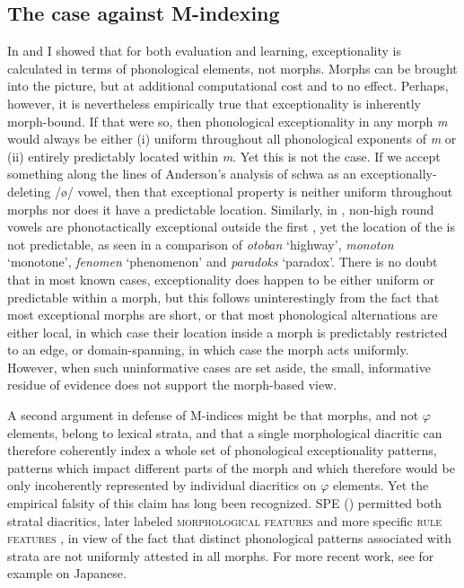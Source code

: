 \documentclass[output=paper,
modfonts
]{LSP/langsci}
\begin{document}
\subsection[The case against M{}-indexing]{The case against M-indexing}\label{sec:round:9.2}
\label{bkm:Ref336968525}
In  and  I showed that for both  evaluation and  learning, exceptionality is calculated in terms of phonological elements, not morphs. Morphs can be brought into the picture, but at additional computational cost and to no effect. Perhaps, however, it is nevertheless empirically true that exceptionality is inherently morph-bound. If that were so, then phonological exceptionality in any morph \textit{m} would always be either (i) uniform throughout all phonological exponents of \textit{m} or (ii) entirely predictably located within \textit{m}. Yet this is not the case. If we accept something along the lines of Anderson's \citeyearpar{anderson1982} analysis of  schwa as an exceptionally-deleting /ø/ vowel, then that exceptional property is neither uniform throughout morphs nor does it have a predictable location. Similarly, in , non-high round vowels are phonotactically exceptional outside the first  \citep{clements1982r,Van1991}, yet the location of the  is not predictable, as seen in a comparison of \textit{otoban} `highway', \textit{monoton} `monotone', \textit{fenomen} `phenomenon' and \textit{paradoks} `paradox'. There is no doubt that in most known cases, exceptionality does happen to be either uniform or predictable within a morph, but this follows uninterestingly from the fact that most exceptional morphs are short, or that most phonological alternations are either local, in which case their location inside a morph is predictably restricted to an edge, or domain-spanning, in which case the morph acts uniformly. However, when such uninformative cases are set aside, the small, informative residue of evidence does not support the morph-based view.

A second argument in defense of M-indices might be that morphs, and not $\varphi $ elements, belong to lexical strata, and that a single morphological diacritic can therefore coherently index a whole set of phonological exceptionality patterns, patterns which impact different parts of the morph and which therefore would be only incoherently represented by individual diacritics on $\varphi $ elements. Yet the empirical falsity of this claim has long been recognized. SPE (\citealt{chomskyhalle1968}) permitted both stratal diacritics, later labeled \textsc{morphological features} \citep{postal1968} and more specific \textsc{rule features} \citep{lakoff1970}, in view of the fact that distinct phonological patterns associated with strata are not uniformly attested in all morphs. For more recent work, see for example \citet[71,72,85ff]{labrune2012} on Japanese.
\end{document}
